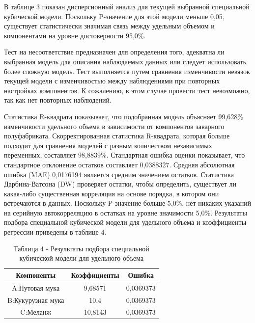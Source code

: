 \begin{multicols}{2}
В таблице 3 показан дисперсионный анализ для текущей выбранной
специальной кубической модели. Поскольку P-значение для этой модели
меньше 0,05, существует статистически значимая связь между удельным
объемом и компонентами на уровне достоверности 95,0\%.

Тест на несоответствие предназначен для определения того, адекватна ли
выбранная модель для описания наблюдаемых данных или следует
использовать более сложную модель. Тест выполняется путем сравнения
изменчивости невязок текущей модели с изменчивостью между наблюдениями
при повторных настройках компонентов. К сожалению, в этом случае
провести тест невозможно, так как нет повторных наблюдений.

Статистика R-квадрата показывает, что подобранная модель объясняет
99,628\% изменчивости удельного объема в зависимости от компонентов
заварного полуфабриката. Скорректированная статистика R-квадрата,
которая больше подходит для сравнения моделей с разным количеством
независимых переменных, составляет 98,8839\%. Стандартная ошибка оценки
показывает, что стандартное отклонение остатков составляет 0,0388327.
Средняя абсолютная ошибка (MAE) 0,0176194 является средним значением
остатков. Статистика Дарбина-Ватсона (DW) проверяет остатки, чтобы
определить, существует ли какая-либо существенная корреляция на основе
порядка, в котором они встречаются в данных. Поскольку P-значение больше
5,0\%, нет никаких указаний на серийную автокорреляцию в остатках на
уровне значимости 5,0\%. Результаты подбора специальной кубической
модели для удельного объема и коэффициенты регрессии приведены в таблице
4.
\end{multicols}

\begin{table}[H]
\caption*{Таблица 4 - Результаты подбора специальной кубической модели для
удельного объема}
\centering
\begin{tabular}{|c|c|c|}
\hline
Компоненты        & Коэффициенты & Ошибка    \\ \hline
A:Нутовая мука    & 9,68571      & 0,0369373 \\ \hline
B:Кукурузная мука & 10,4         & 0,0369373 \\ \hline
C:Меланж          & 10,8143      & 0,0369373 \\ \hline
\end{tabular}
\end{table}

